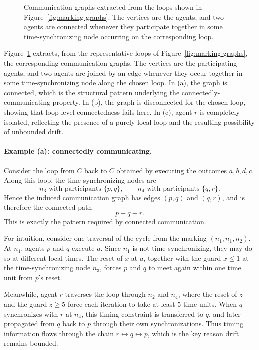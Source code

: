 \begin{example}
\begin{figure}[ht]
\caption{Communication graphs extracted from the loops shown in
Figure~\ref{fig:marking-graphs}. The vertices are the agents, and two agents are
connected whenever they participate together in some time-synchronizing node
occurring on the corresponding loop.}
\label{fig:comm-graphs}
\end{figure}

 Figure~\ref{fig:comm-graphs} extracts, from the representative loops of
Figure~\ref{fig:marking-graphs}, the corresponding communication graphs. The
vertices are the participating agents, and two agents are joined by an edge
whenever they occur together in some time-synchronizing node along the chosen
loop. In (a), the graph is connected, which is the structural pattern underlying
the connectedly-communicating property. In (b), the graph is disconnected for the
chosen loop, showing that loop-level connectedness fails here. In (c), agent
\(r\) is completely isolated, reflecting the presence of a purely local loop and
the resulting possibility of unbounded drift.

\paragraph{Example (a): connectedly communicating.}
Consider the loop from \(C\) back to \(C\) obtained by executing the outcomes
\(a,b,d,c\). Along this loop, the time-synchronizing nodes are
\[
n_3 \text{ with participants } \{p,q\},
\qquad
n_4 \text{ with participants } \{q,r\}.
\]
Hence the induced communication graph has edges \((p,q)\) and \((q,r)\), and is
therefore the connected path
\[
p-q-r.
\]
This is exactly the pattern required by connected communication.

For intuition, consider one traversal of the cycle from the marking
\((n_1,n_1,n_2)\). At \(n_1\), agents \(p\) and \(q\) execute \(a\). Since
\(n_1\) is not time-synchronizing, they may do so at different local times. The
reset of \(x\) at \(a\), together with the guard \(x\le 1\) at the
time-synchronizing node \(n_3\), forces \(p\) and \(q\) to meet again within one
time unit from \(p\)'s reset.

Meanwhile, agent \(r\) traverses the loop through \(n_2\) and \(n_4\), where the
reset of \(z\) and the guard \(z\ge 5\) force each iteration to take at least
\(5\) time units. When \(q\) synchronizes with \(r\) at \(n_4\), this timing
constraint is transferred to \(q\), and later propagated from \(q\) back to \(p\)
through their own synchronizations. Thus timing information flows through the
chain \(r \leftrightarrow q \leftrightarrow p\), which is the key reason drift
remains bounded.


\end{example}

